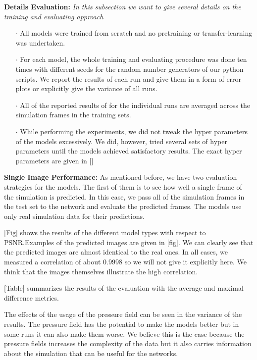 \documentclass{llncs}
\begin{document}
\noindent\textbf{Details Evaluation:}
\emph{In this subsection we want to give several details on the training and evaluating approach}
\begin{itemize}
\item[$\cdot$] All models were trained from scratch and no pretraining or transfer-learning was undertaken.
\item[$\cdot$] For each model, the whole training and evaluating procedure was done ten times with different seeds for the random number generators of our python scripts. We report the results of each run and give them in a form of error plots or explicitly give the variance of all runs.
\item[$\cdot$] All of the reported results of for the individual runs are averaged across the simulation frames in the training sets.
\item[$\cdot$] While performing the experiments, we did not tweak the hyper parameters of the models excessively. We did, however, tried several sets of hyper parameters until the models achieved satisfactory results. The exact hyper parameters are given in []
\end{itemize}

\noindent\textbf{Single Image Performance:}
As mentioned before, we have two evaluation strategies for the models. The first of them is to see how well a single frame of the simulation is predicted. In this case, we pass all of the simulation frames in the test set to the network and evaluate the predicted frames. The models use only real simulation data for their predictions.

[Fig] shows the results of the different model types with respect to PSNR.\@ Examples of the predicted images are given in [fig]. We can clearly see that the predicted images are almost identical to the real ones. In all cases, we measured a correlation of about $0.9998$ so we will not give it explicitly here. We think that the images themselves illustrate the high correlation.

[Table] summarizes the results of the evaluation with the average and maximal difference metrics.

The effects of the usage of the pressure field can be seen in the variance of the results. The pressure field has the potential to make the models better but in some runs it can also make them worse. We believe this is the case because the pressure fields increases the complexity of the data but it also carries information about the simulation that can be useful for the networks.
\end{document}
